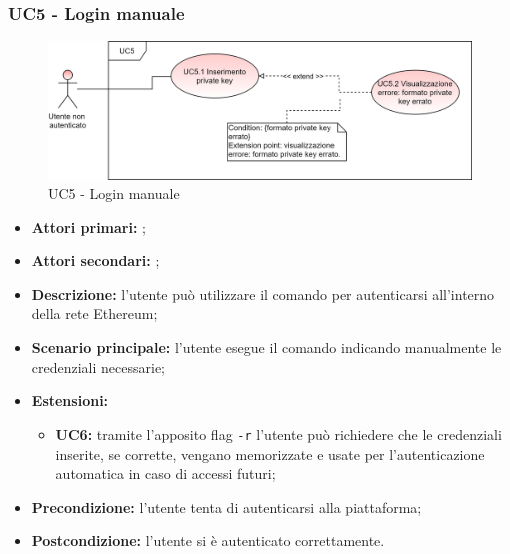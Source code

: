 \subsubsection{UC5 - Login manuale}
\begin{figure}[H]
	\centering
	\includegraphics[scale=\ucs]{./res/img/UC5.png}
	\caption {UC5 - Login manuale}
\end{figure}
\begin{itemize}
	\item \textbf{Attori primari:} \una{};
	\item \textbf{Attori secondari:} \re{};
	\item \textbf{Descrizione:} l’utente può utilizzare il comando \login{} per autenticarsi all’interno della rete Ethereum; 
	\item \textbf{Scenario principale:} l'utente esegue il comando \login{} indicando manualmente le credenziali necessarie; 
	\item \textbf{Estensioni:} 
	\begin{itemize}
		\item \textbf{UC6:} tramite l’apposito flag \texttt{-r} l’utente può richiedere che le credenziali inserite, se corrette, vengano memorizzate e usate per l'autenticazione automatica in caso di accessi futuri;
	\end{itemize}
	\item \textbf{Precondizione:} l’utente tenta di autenticarsi alla piattaforma;
	\item \textbf{Postcondizione:} l’utente si è autenticato correttamente.
\end{itemize}